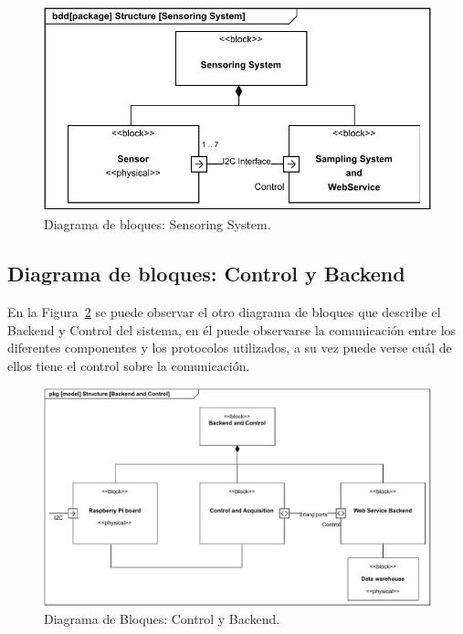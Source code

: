 \begin{figure}[h!]
\centering
\includegraphics[scale=1.2]{images/bloques.pdf}
\caption{Diagrama de bloques: Sensoring System.}%
\label{fig:diagramaBloques}

\end{figure}


\subsection{Diagrama de bloques: Control y Backend}


En la Figura~\ref{fig:diagramaControl} se puede observar el otro diagrama de bloques que describe el Backend y Control del sistema, en él puede observarse la comunicación entre los diferentes componentes y los protocolos utilizados, a su vez puede verse cuál de ellos tiene el control sobre la comunicación.

\begin{figure}[h!]
\centering
\includegraphics[width=\textwidth]{images/model.pdf}
\caption{Diagrama de Bloques: Control y Backend.}%
\label{fig:diagramaControl}

\end{figure}


